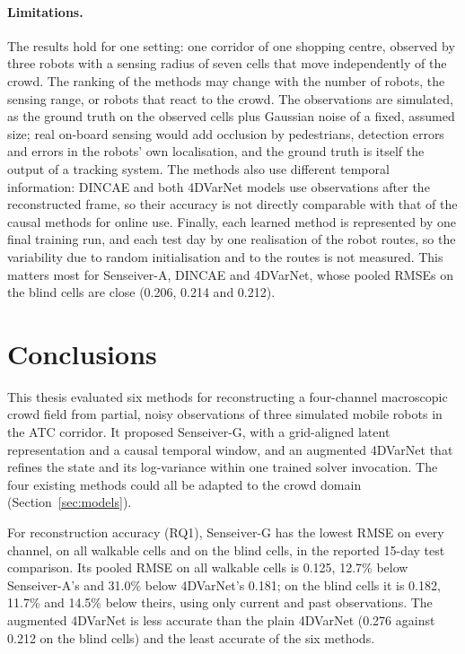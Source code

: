 \documentclass[english, 12pt, a4paper, elec, utf8, a-2b, online]{aaltothesis}
\begin{document}
\paragraph{Limitations.}
The results hold for one setting: one corridor of one shopping centre, observed
by three robots with a sensing radius of seven cells that move independently of
the crowd. The ranking of the methods may change with the number of robots, the
sensing range, or robots that react to the crowd. The observations are
simulated, as the ground truth on the observed cells plus Gaussian noise of a
fixed, assumed size; real on-board sensing would add occlusion by pedestrians,
detection errors and errors in the robots' own localisation, and the ground
truth is itself the output of a tracking system. The methods also use different
temporal information: DINCAE and both 4DVarNet models use observations after
the reconstructed frame, so their accuracy is not directly comparable with
that of the causal methods for online use. Finally, each learned method is
represented by one final training run, and each test day by one realisation of
the robot routes, so the variability due to random initialisation and to the
routes is not measured. This matters most for Senseiver\nobreakdash-A, DINCAE and 4DVarNet,
whose pooled RMSEs on the blind cells are close (0.206, 0.214 and 0.212).

\clearpage

\section{Conclusions}
\label{sec:summary}

This thesis evaluated six methods for reconstructing a four-channel
macroscopic crowd field from partial, noisy observations of three simulated
mobile robots in the ATC corridor. It proposed Senseiver\nobreakdash-G, with a grid-aligned
latent representation and a causal temporal window, and an augmented 4DVarNet
that refines the state and its log-variance within one trained solver invocation.
The four existing methods could all be adapted to the crowd domain
(Section~\ref{sec:models}).

For reconstruction accuracy (RQ1), Senseiver\nobreakdash-G has the lowest RMSE on every
channel, on all walkable cells and on the blind cells, in the reported 15-day
test comparison. Its pooled RMSE on all walkable cells is 0.125, 12.7\% below
Senseiver\nobreakdash-A's and 31.0\% below 4DVarNet's 0.181; on the blind cells it is
0.182, 11.7\% and 14.5\% below theirs, using only current and past
observations. The augmented 4DVarNet is less accurate than the plain 4DVarNet
(0.276 against 0.212 on the blind cells) and the least accurate of the six
methods.
\end{document}
